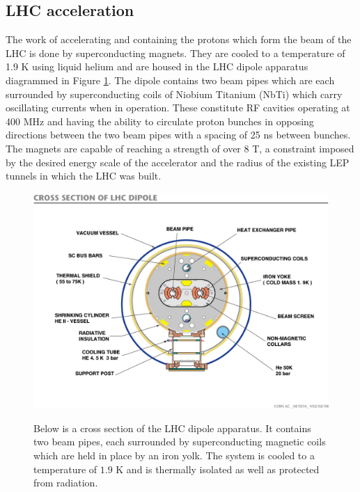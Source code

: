 \subsection{LHC acceleration}
The work of accelerating and containing
 the protons which %
 form %
 the beam of
 the LHC is done by superconducting magnets. 
They are cooled to a temperature of 1.9 K
 using liquid helium and are housed in the
 LHC dipole apparatus diagrammed in Figure \ref{fig:lhc_dipole}.
The dipole contains two beam pipes which are
 each surrounded by superconducting coils
 of Niobium Titanium (NbTi)
 which carry oscillating currents when in operation.
These constitute RF cavities
 operating at 400 MHz and having the 
 ability to circulate proton
 bunches in opposing directions 
 between the two beam pipes
 with a spacing of 25 ns between bunches.
The magnets are capable of reaching 
 a strength of over 8 T, a constraint
 imposed by the desired energy scale 
 of the accelerator and the radius of the
 existing LEP tunnels
 in which the LHC was built.  
 
\begin{figure}[tb]
\caption[The LHC dipole]{
 Below is a cross section of the LHC dipole apparatus.
 It contains two beam pipes, each surrounded
  by superconducting magnetic coils
  which are held in place by an iron yolk.
 The system is cooled to a temperature of
  $1.9$ K and is thermally isolated 
  as well as protected from radiation.
 }
\includegraphics[width=\textwidth]{pdfs/experiment/lhc_dipole.jpg}
\label{fig:lhc_dipole}
\end{figure}

